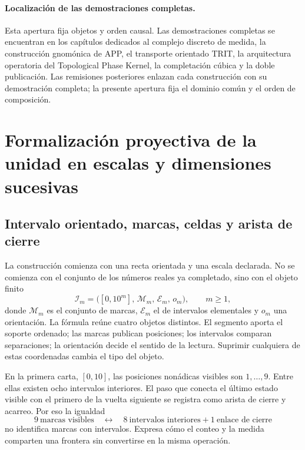 \paragraph{Localización de las demostraciones completas.}
Esta apertura fija objetos y orden causal. Las demostraciones completas se
encuentran en los capítulos dedicados al complejo discreto de medida, la
construcción gnomónica de APP, el transporte orientado TRIT, la arquitectura
operatoria del Topological Phase Kernel, la completación cúbica y la doble
publicación. Las remisiones posteriores enlazan cada construcción con su
demostración completa; la presente apertura fija el dominio común y el orden
de composición.


\section{Formalización proyectiva de la unidad en escalas y dimensiones sucesivas}
\label{p12-83-c0-s2:chap:ampliacion-conservacion-unidad}

\subsection{Intervalo orientado, marcas, celdas y arista de cierre}

La construcción comienza con una recta orientada y una escala declarada. No
se comienza con el conjunto de los números reales ya completado, sino con el
objeto finito
\begin{equation}\label{p12-83-c0-s2:eq:amp-recta-k}
 \mathcal I_m=\bigl([0,10^m],\,\mathcal M_m,\,\mathcal E_m,\,o_m\bigr),
 \qquad m\geq1,
\end{equation}
donde \(\mathcal M_m\) es el conjunto de marcas, \(\mathcal E_m\) el de
intervalos elementales y \(o_m\) una orientación. La fórmula reúne cuatro
objetos distintos. El segmento aporta el soporte ordenado; las marcas
publican posiciones; los intervalos comparan separaciones; la orientación
decide el sentido de la lectura. Suprimir cualquiera de estas coordenadas
cambia el tipo del objeto.

En la primera carta, \([0,10]\), las posiciones nonádicas visibles son
\(1,\ldots,9\). Entre ellas existen ocho intervalos interiores. El paso que
conecta el último estado visible con el primero de la vuelta siguiente se
registra como arista de cierre y acarreo. Por eso la igualdad
\begin{equation}\label{p12-83-c0-s2:eq:amp-nueve-marcas-ocho-intervalos}
 9\ \text{marcas visibles}
 \quad\longleftrightarrow\quad
 8\ \text{intervalos interiores}+1\ \text{enlace de cierre}
\end{equation}
no identifica marcas con intervalos. Expresa cómo el conteo y la medida
comparten una frontera sin convertirse en la misma operación.


